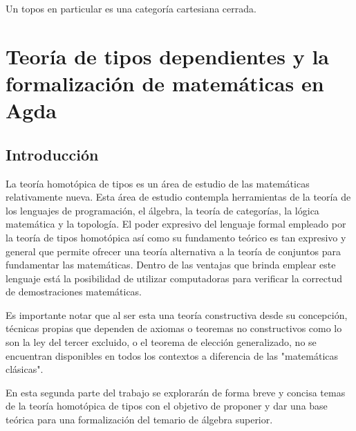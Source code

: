 \documentclass{article}
\begin{document}
\begin{remark}
    Un topos en particular es una categoría cartesiana cerrada.
\end{remark}

\begin{definition}[Limite]
    
\end{definition}

\begin{definition}
    
\end{definition}

\begin{definition}[Adjunción]
    
\end{definition}

\section{Teoría de tipos dependientes y la formalización de matemáticas en Agda}
\subsection{Introducción}
La teoría homotópica de tipos es un área de estudio de las matemáticas 
relativamente nueva. Esta área de estudio contempla herramientas de la teoría de 
los lenguajes de programación, el álgebra, la teoría de categorías, la lógica 
matemática y la topología. El poder expresivo del lenguaje formal empleado por 
la teoría de tipos homotópica así como su fundamento teórico es tan expresivo y 
general que permite ofrecer una teoría alternativa a la teoría de conjuntos para 
fundamentar las matemáticas. Dentro de las ventajas que brinda emplear este 
lenguaje está la posibilidad de utilizar computadoras para verificar la 
correctud de demostraciones matemáticas.


Es importante notar que al ser esta una teoría constructiva desde su concepción, 
técnicas propias que dependen de axiomas o teoremas no constructivos como lo son
la ley del tercer excluido, o el teorema de elección generalizado, no se 
encuentran disponibles en todos los contextos a diferencia de las "matemáticas 
clásicas".

En esta segunda parte del trabajo se explorarán de forma breve y concisa temas 
de la teoría homotópica de tipos con el objetivo de proponer y dar una base 
teórica para una formalización del temario de álgebra superior.
\end{document}
